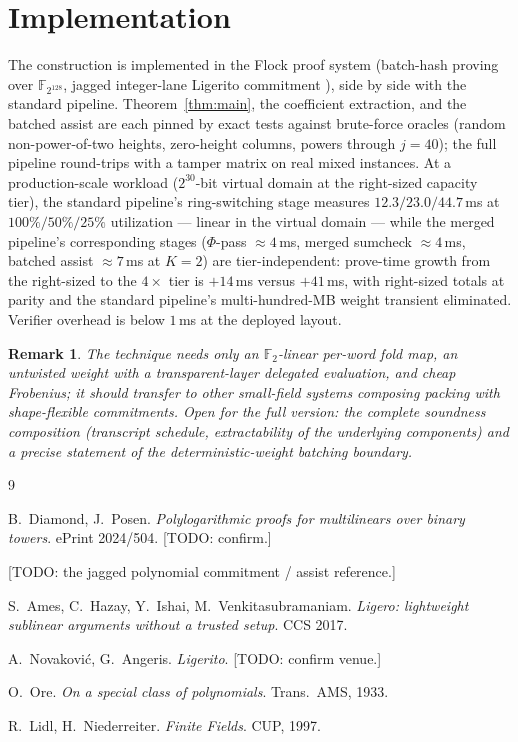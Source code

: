 \documentclass[11pt]{article}
\newcommand{\F}{\mathbb{F}}
\newcommand{\Ftwo}{\F_2}
\newtheorem{remark}[theorem]{Remark}
\begin{document}
\section{Implementation}\label{sec:eval}

The construction is implemented in the Flock proof system (batch-hash
proving over $\F_{2^{128}}$, jagged integer-lane Ligerito commitment
\cite{ligero,ligerito}), side by side with the standard pipeline.
Theorem~\ref{thm:main}, the coefficient extraction, and the batched
assist are each pinned by exact tests against brute-force oracles
(random non-power-of-two heights, zero-height columns, powers through
$j = 40$); the full pipeline round-trips with a tamper matrix on real
mixed instances. At a production-scale workload ($2^{30}$-bit virtual
domain at the right-sized capacity tier), the standard pipeline's
ring-switching stage measures $12.3 / 23.0 / 44.7$\,ms at
$100\%/50\%/25\%$ utilization --- linear in the virtual domain ---
while the merged pipeline's corresponding stages
($\Phi$-pass ${\approx}4$\,ms, merged sumcheck ${\approx}4$\,ms,
batched assist ${\approx}7$\,ms at $K = 2$) are tier-independent: prove-time
growth from the right-sized to the $4\times$ tier is $+14$\,ms versus
$+41$\,ms, with right-sized totals at parity and the standard
pipeline's multi-hundred-MB weight transient eliminated. Verifier
overhead is below $1$\,ms at the deployed layout.

\begin{remark}
The technique needs only an $\Ftwo$-linear per-word fold map, an
untwisted weight with a transparent-layer delegated evaluation, and
cheap Frobenius; it should transfer to other small-field systems
composing packing with shape-flexible commitments. Open for the full
version: the complete soundness composition (transcript schedule,
extractability of the underlying components) and a precise statement
of the deterministic-weight batching boundary.
\end{remark}

\begin{thebibliography}{9}\small

B.~Diamond, J.~Posen.
\emph{Polylogarithmic proofs for multilinears over binary towers}.
ePrint 2024/504. [TODO: confirm.]

[TODO: the jagged polynomial commitment / assist reference.]

S.~Ames, C.~Hazay, Y.~Ishai, M.~Venkitasubramaniam.
\emph{Ligero: lightweight sublinear arguments without a trusted setup}.
CCS 2017.

A.~Novakovi\'c, G.~Angeris. \emph{Ligerito}. [TODO: confirm venue.]

O.~Ore. \emph{On a special class of polynomials}. Trans.\ AMS, 1933.

R.~Lidl, H.~Niederreiter. \emph{Finite Fields}. CUP, 1997.

\end{thebibliography}
\end{document}
